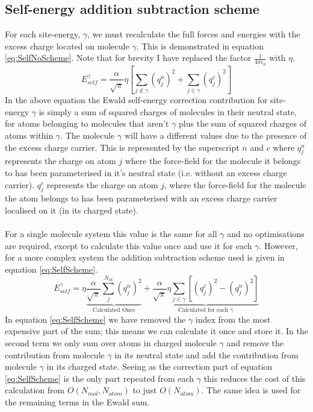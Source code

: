 \subsection{Self-energy addition subtraction scheme}
For each site-energy, $\gamma$, we must recalculate the full forces and energies with the excess charge located on molecule $\gamma$. This is demonstrated in equation \eqref{eq:SelfNoScheme}. Note that for brevity I have replaced the factor $\frac{1}{4 \pi \epsilon_0}$ with $\eta$.
\begin{equation}
  E_{self}^{\gamma} = \frac{\alpha}{\sqrt{\pi}} \eta \left[\sum_{j \not\in \gamma} \left(q^{n}_{j}\right)^2  + \sum_{j \in \gamma} \left(q^{c}_{j}\right)^2\right]
  \label{eq:SelfNoScheme}
\end{equation}
In the above equation the Ewald self-energy correction contribution for site-energy $\gamma$ is simply a sum of squared charges of molecules in their neutral state, for atoms belonging to molecules that aren't $\gamma$ plus the sum of squared charges of atoms within $\gamma$. The molecule $\gamma$ will have a different values due to the presence of the excess charge carrier. This is represented by the superscript $n$ and $c$ where $q^{n}_{j}$ represents the charge on atom $j$ where the force-field for the molecule it belongs to has been parameterised in it's neutral state (i.e. without an excess charge carrier). $q^{c}_{j}$ represents the charge on atom $j$, where the force-field for the molecule the atom belongs to has been parameterised with an excess charge carrier localised on it (in its charged state).
\\\\
For a single molecule system this value is the same for all $\gamma$ and no optimisations are required, except to calculate this value once and use it for each $\gamma$. However, for a more complex system the addition subtraction scheme used is given in equation \eqref{eq:SelfScheme}.
\begin{equation}
  E_{self}^{\gamma} = \eta \underbrace{\frac{\alpha}{\sqrt{\pi}} \sum_{j}^{N_{at}}\left(q_{j}^{n}\right)^2}_{\text{Calculated Once}} + \underbrace{\frac{\alpha}{\sqrt{\pi}} \eta \sum_{j \in \gamma} \left[ (q^{c}_{j})^2 - (q^{n}_{j})^2 \right]}_{\text{Calculated for each $\gamma$}}
  \label{eq:SelfScheme}
\end{equation}
In equation \eqref{eq:SelfScheme} we have removed the $\gamma$ index from the most expensive part of the sum; this means we can calculate it once and store it. In the second term we only sum over atoms in charged molecule $\gamma$ and remove the contribution from molecule $\gamma$ in its neutral state and add the contribution from molecule $\gamma$ in its charged state. Seeing as the correction part of equation \eqref{eq:SelfScheme} is the only part repeated from each $\gamma$ this reduces the cost of this calculation from $O(N_{mol}, N_{atom})$ to just $O(N_{atom})$. The same idea is used for the remaining terms in the Ewald sum.
